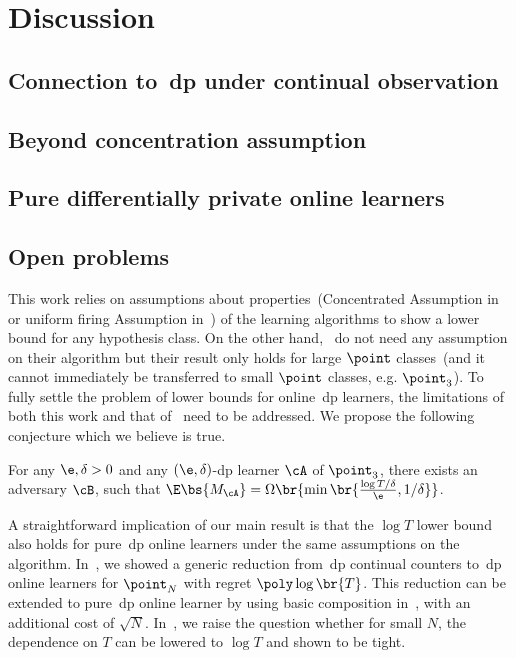 \section{Discussion}
\label{sec:discussion}
\subsection{Connection to~\Gls{dp} under continual observation}\label{sec:continual}


\subsection{Beyond concentration assumption}
\label{sec:beyond_conc}


\subsection{Pure differentially private online learners}


\subsection{Open problems}

This work relies on assumptions about properties~(Concentrated Assumption in~ or uniform firing Assumption in~) of the learning algorithms to show a lower bound for any hypothesis class. On the other hand,~\citet{cohen2024lower} do not need any assumption on their algorithm but their result only holds for large \(\point\) classes~(and it cannot immediately be transferred to small \(\point\) classes, e.g. \(\point_3\)). To fully settle the problem of lower bounds for online~\Gls{dp} learners, the limitations of both this work and that of~\citet{cohen2024lower} need to be addressed. We propose the following conjecture which we believe is true.
\begin{conjecture}
\label{conj:approx-dp-lower}
For any \(\e, \delta > 0\) and any \((\e, \delta)\)-\Gls{dp} learner \(\cA\) of \(\point_3\), there exists an adversary \(\cB\), such that \(\E \bs{M_{\cA}} = \Omega\br{\min\br{\frac{\log T / \delta}{\e}, 1 / \delta}}\).
\end{conjecture}

A straightforward implication of our main result is that the \(\log T\) lower bound also holds for pure~\Gls{dp} online learners under the same assumptions on the algorithm. In~, we showed a generic reduction from~\Gls{dp} continual counters to~\Gls{dp} online learners for \(\point_N\) with regret \(\poly\log \br{T}\). This reduction can be extended to  pure~\Gls{dp} online learner by using basic composition in~, with an additional cost of \(\sqrt{N}\). In~, we raise the question whether for small \(N\), the dependence on \(T\) can be lowered to \(\log T\) and shown to be tight.


